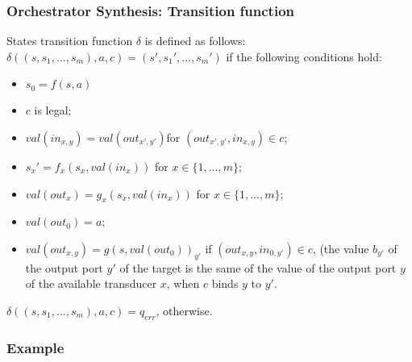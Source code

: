 \documentclass{beamer}
\theoremstyle{definition}
\theoremstyle{plain}
\begin{document}
\begin{frame}
\frametitle{Orchestrator Synthesis: Transition function}
States transition function $\delta$ is defined as follows: \\
$\delta((s, s_{1}, . . .  , s_{m}), a, c) = (s', s_{1}', . . .  , s_{m}')$ if the following conditions hold:
\begin{itemize}
\item $s_{0} = f(s, a)$
\item $c$ is legal;
\item $val(in_{x,y}) = val(out_{x',y'})$for $(out_{x',y'}, in_{x,y}) \in c$;
\item $s_{x}' = f_{x}(s_{x}, val(in_{x})) $ for $ x \in \{1, . . . ,m\}$;
\item $ val(out_{x}) = g_{x}(s_{x}, val(in_{x})) $ for $ x \in \{1, . . . ,m\}$;
\item $val(out_{0}) = a$;
\item $val(out_{x,y}) = g(s, val(out_{0}))_{y'}$ if $(out_{x,y}, in_{0, y'}) \in c$, (the value $b_{y'}$ of the output port $y'$ of the target is the same of the value of the output port $y$ of the available transducer $x$, when $c$ binds $y$ to $y'$.
\end{itemize}
$\delta((s, s_{1}, . . .  , s_{m}), a, c) = q_{err}$, otherwise.
\end{frame}

\begin{frame}
\frametitle{Example}



\end{frame}
\end{document}
